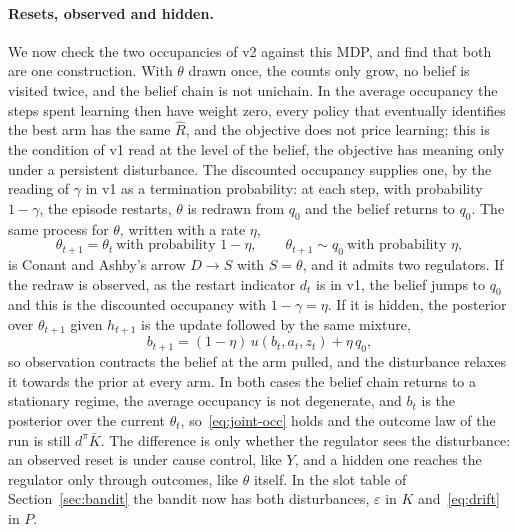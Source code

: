 \documentclass[11pt]{article}
\theoremstyle{remark}
\newcommand{\1}{\mathds{1}}
\newcommand{\occ}{d^{\pi}}
\begin{document}
\paragraph{Resets, observed and hidden.}
We now check the two occupancies of v2 against this MDP, and find that both are one construction.
With $\theta$ drawn once, the counts only grow, no belief is visited twice, and the belief chain is not unichain.
In the average occupancy the steps spent learning then have weight zero, every policy that eventually identifies the best arm has the same $\hat R$, and the objective does not price learning; this is the condition of v1 read at the level of the belief, the objective has meaning only under a persistent disturbance.
The discounted occupancy supplies one, by the reading of $\gamma$ in v1 as a termination probability: at each step, with probability $1-\gamma$, the episode restarts, $\theta$ is redrawn from $q_0$ and the belief returns to $q_0$.
The same process for $\theta$, written with a rate $\eta$,
\begin{equation}
  \theta_{t+1}=\theta_t\ \text{with probability }1-\eta,
  \qquad
  \theta_{t+1}\sim q_0\ \text{with probability }\eta,
  \label{eq:drift}
\end{equation}
is Conant and Ashby's arrow $D\to S$ with $S=\theta$, and it admits two regulators.
If the redraw is observed, as the restart indicator $d_t$ is in v1, the belief jumps to $q_0$ and this is the discounted occupancy with $1-\gamma=\eta$.
If it is hidden, the posterior over $\theta_{t+1}$ given $h_{t+1}$ is the update followed by the same mixture,
\begin{equation}
  b_{t+1}=(1-\eta)\,u(b_t,a_t,z_t)+\eta\,q_0 ,
  \label{eq:belief-relax}
\end{equation}
so observation contracts the belief at the arm pulled, and the disturbance relaxes it towards the prior at every arm.
In both cases the belief chain returns to a stationary regime, the average occupancy is not degenerate, and $b_t$ is the posterior over the current $\theta_t$, so~\eqref{eq:joint-occ} holds and the outcome law of the run is still $\occ\bar K$.
The difference is only whether the regulator sees the disturbance: an observed reset is under cause control, like $Y$, and a hidden one reaches the regulator only through outcomes, like $\theta$ itself.
In the slot table of Section~\ref{sec:bandit} the bandit now has both disturbances, $\varepsilon$ in $K$ and~\eqref{eq:drift} in $P$.
\end{document}
